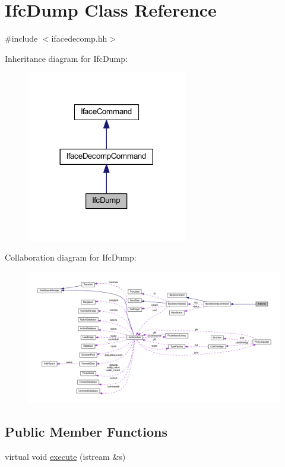 \hypertarget{class_ifc_dump}{}\section{Ifc\+Dump Class Reference}
\label{class_ifc_dump}


{\ttfamily \#include $<$ifacedecomp.\+hh$>$}



Inheritance diagram for Ifc\+Dump\+:
\nopagebreak
\begin{figure}[H]
\begin{center}
\leavevmode
\includegraphics[width=197pt]{class_ifc_dump__inherit__graph}
\end{center}
\end{figure}


Collaboration diagram for Ifc\+Dump\+:
\nopagebreak
\begin{figure}[H]
\begin{center}
\leavevmode
\includegraphics[width=350pt]{class_ifc_dump__coll__graph}
\end{center}
\end{figure}
\subsection*{Public Member Functions}
\begin{DoxyCompactItemize}
\item 
virtual void \mbox{\hyperlink{class_ifc_dump_a4e3abbc8ca445ed10d88c2cf31f57601}{execute}} (istream \&s)
\end{DoxyCompactItemize}
